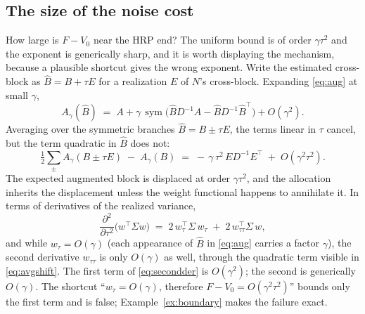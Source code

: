 \documentclass[11pt]{article}
\theoremstyle{remark}
\begin{document}
\subsection{The size of the noise cost}
\label{sec:noisecost}

How large is $F - V_0$ near the HRP end? The uniform bound is of order
$\gamma\tau^2$ and the exponent is generically sharp, and it is worth
displaying the mechanism, because a plausible shortcut gives the wrong
exponent. Write the estimated cross-block
as $\widehat B = B + \tau E$ for a realization $E$ of $N$'s cross-block.
Expanding \eqref{eq:aug} at small $\gamma$,
\begin{equation}
  A_\gamma(\widehat B)
  \;=\; A + \gamma\,\operatorname{sym}\!\big(\widehat B D^{-1} A
        - \widehat B D^{-1} \widehat B^\top\big) + O(\gamma^2).
  \label{eq:augexp}
\end{equation}
Averaging over the symmetric branches $\widehat B = B \pm \tau E$, the terms
linear in $\tau$ cancel, but the term quadratic in $\widehat B$ does not:
\begin{equation}
  \tfrac12 \sum_{\pm} A_\gamma(B \pm \tau E) \;-\; A_\gamma(B)
  \;=\; -\,\gamma\,\tau^2\, E D^{-1} E^\top \;+\; O(\gamma^2 \tau^2).
  \label{eq:avgshift}
\end{equation}
The expected augmented block is displaced at order $\gamma\tau^2$, and the
allocation inherits the displacement unless the weight functional happens to
annihilate it. In terms of derivatives of the realized variance,
\begin{equation}
  \frac{\partial^2}{\partial \tau^2}\big(w^\top \Sigma w\big)
  \;=\; 2\, w_\tau^\top \Sigma\, w_\tau \;+\; 2\, w_{\tau\tau}^\top \Sigma\, w,
  \label{eq:secondder}
\end{equation}
and while $w_\tau = O(\gamma)$ (each appearance of $\widehat B$ in
\eqref{eq:aug} carries a factor $\gamma$), the second derivative
$w_{\tau\tau}$ is only $O(\gamma)$ as well, through the quadratic term
visible in \eqref{eq:avgshift}. The first term of \eqref{eq:secondder} is
$O(\gamma^2)$; the second is generically $O(\gamma)$. The shortcut
``$w_\tau = O(\gamma)$, therefore $F - V_0 = O(\gamma^2\tau^2)$'' bounds
only the first term and is false; Example~\ref{ex:boundary} makes the
failure exact.
\end{document}
